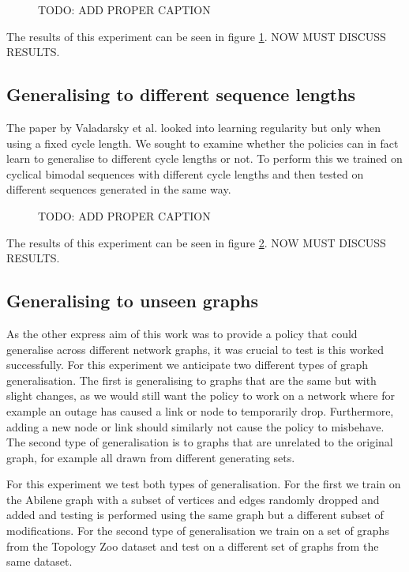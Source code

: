 \begin{figure}
    \centering
%    
    \caption{TODO: ADD PROPER CAPTION}
    \label{fig:exp_cyclic}
\end{figure}

The results of this experiment can be seen in figure \ref{fig:exp_cyclic}. NOW MUST DISCUSS RESULTS.

\subsection{Generalising to different sequence lengths}
The paper by Valadarsky et al. looked into learning regularity but only when using a fixed cycle length. We sought to examine whether the policies can in fact learn to generalise to different cycle lengths or not. To perform this we trained on cyclical bimodal sequences with different cycle lengths and then tested on different sequences generated in the same way.

\begin{figure}
    \centering
%    
    \caption{TODO: ADD PROPER CAPTION}
    \label{fig:exp_vary}
\end{figure}

The results of this experiment can be seen in figure \ref{fig:exp_vary}. NOW MUST DISCUSS RESULTS.

\subsection{Generalising to unseen graphs}
As the other express aim of this work was to provide a policy that could generalise across different network graphs, it was crucial to test is this worked successfully. For this experiment we anticipate two different types of graph generalisation. The first is generalising to graphs that are the same but with slight changes, as we would still want the policy to work on a network where for example an outage has caused a link or node to temporarily drop. Furthermore, adding a new node or link should similarly not cause the policy to misbehave. The second type of generalisation is to graphs that are unrelated to the original graph, for example all drawn from different generating sets.

For this experiment we test both types of generalisation. For the first we train on the Abilene graph with a subset of vertices and edges randomly dropped and added and testing is performed using the same graph but a different subset of modifications. For the second type of generalisation we train on a set of graphs from the Topology Zoo dataset and test on a different set of graphs from the same dataset.

